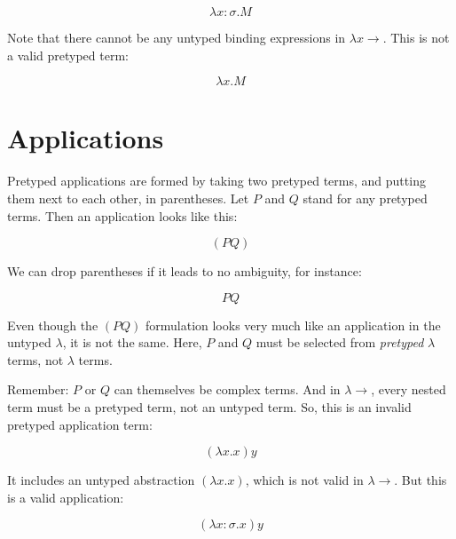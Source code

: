 \documentclass{book}
\numberwithin{equation}{chapter}
\begin{document}
\begin{equation}
\lambda x : \sigma.M
\end{equation}

\noindent
Note that there cannot be any untyped binding expressions in $\lambda x\rightarrow$. This is not a valid pretyped term:

\begin{equation}
\lambda x.M
\end{equation}


\section{Applications}

Pretyped applications are formed by taking two pretyped terms, and putting them next to each other, in parentheses. Let $P$ and $Q$ stand for any pretyped terms. Then an application looks like this:

\begin{equation}
(P Q)
\end{equation}

\noindent
We can drop parentheses if it leads to no ambiguity, for instance:

\begin{equation}
P Q
\end{equation}

\noindent
Even though the $(P Q)$ formulation looks very much like an application in the untyped $\lambda$, it is not the same. Here, $P$ and $Q$ must be selected from \textit{pretyped} $\lambda$ terms, not  $\lambda$ terms.

Remember: $P$ or $Q$ can themselves be complex terms. And in $\lambda\rightarrow$, every nested term must be a pretyped term, not an untyped term. So, this is an invalid pretyped application term:

\begin{equation}
(\lambda x.x) y
\end{equation}

\noindent
It includes an untyped abstraction $(\lambda x.x)$, which is not valid in $\lambda\rightarrow$. But this is a valid application:

\begin{equation}
(\lambda x : \sigma.x) y
\end{equation}


\end{document}
